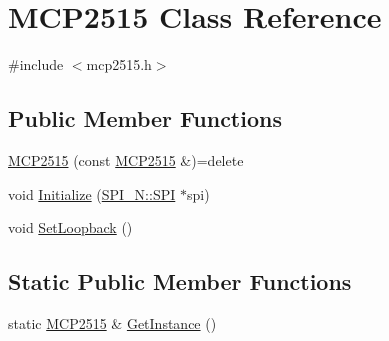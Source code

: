 \hypertarget{class_m_c_p2515}{}\section{M\+C\+P2515 Class Reference}
\label{class_m_c_p2515}


{\ttfamily \#include $<$mcp2515.\+h$>$}

\subsection*{Public Member Functions}
\begin{DoxyCompactItemize}
\item 
\hyperlink{class_m_c_p2515_a8cd4111604b740feb758bd4d077f4fb8}{M\+C\+P2515} (const \hyperlink{class_m_c_p2515}{M\+C\+P2515} \&)=delete
\item 
void \hyperlink{class_m_c_p2515_a41921933b4f2595e8935f8432dd8d65b}{Initialize} (\hyperlink{class_s_p_i___n_1_1_s_p_i}{S\+P\+I\+\_\+\+N\+::\+S\+PI} $\ast$spi)
\item 
void \hyperlink{class_m_c_p2515_a7aac5fdb713b83933391348f1188f2b9}{Set\+Loopback} ()
\end{DoxyCompactItemize}
\subsection*{Static Public Member Functions}
\begin{DoxyCompactItemize}
\item 
static \hyperlink{class_m_c_p2515}{M\+C\+P2515} \& \hyperlink{class_m_c_p2515_a3f53839a9258086fd21e2fc4190de60d}{Get\+Instance} ()
\end{DoxyCompactItemize}
